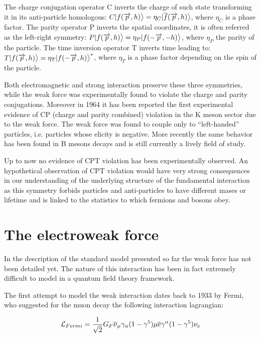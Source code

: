 The charge conjugation operator C inverts the charge of such state transforming it in its anti-particle homologous: $C|f(\overrightarrow{p}, h)\big{>} = \eta_C|\overline{f}(\overrightarrow{p}, h)\big{>}$, where $\eta_C$ is a phase factor. The parity operator P inverts the spatial coordinates, it is often referred as the left-right symmetry: $P|f(\overrightarrow{p}, h)\big{>} = \eta_P|f(-\overrightarrow{p}, -h)\big{>}$, where $\eta_P$ the parity of the particle. The time inversion operator T inverts time leading to: $T|f(\overrightarrow{p}, h)\big{>} = \eta_T|f(-\overrightarrow{p}, h)\big{>}^*$, where $\eta_T$ is a phase factor depending on the spin of the particle.

Both electromagnetic and strong interaction preserve these three symmetries, while the weak force was experimentally found to violate the charge and parity conjugations. Moreover in 1964 it has been reported the first experimental evidence of CP (charge and parity combined) violation in the K meson sector \cite{PhysRevLett.13.138} due to the weak force. The weak force was found to couple only to ``left-handed'' particles, i.e. particles whose elicity is negative. More recently the same behavior has been found in B mesons decays and is still currently a lively field of study. 

Up to now no evidence of CPT violation has been experimentally observed. An hypothetical observation of CPT violation would have very strong consequences in our understanding of the underlying structure of the fundamental interaction as this symmetry forbids particles and anti-particles to have different mases or lifetime and is linked to the statistics to which fermions and bosons obey.

\section{The electroweak force}

In the description of the standard model presented so far the weak force has not been detailed yet. The nature of this interaction has been in fact extremely difficult to model in a quantum field theory framework.

The first attempt to model the weak interaction dates back to 1933 by Fermi, who suggested for the muon decay the following interaction lagrangian:

\begin{equation}
\mathcal{L}_{Fermi} = \dfrac{1}{\sqrt{2}} G_F \overline{\nu}_\mu \gamma_\alpha (1-\gamma^5) \mu \overline{e} \gamma^\alpha (1-\gamma^5) \nu_e
\end{equation}

